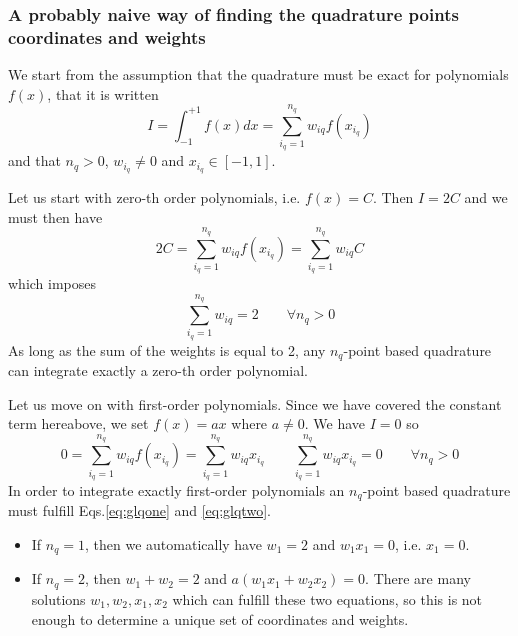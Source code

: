\subsubsection{A probably naive way of finding the quadrature points coordinates and weights}


We start from the assumption that the quadrature must be exact for polynomials $f(x)$, that it is 
written
\[
I= \int_{-1}^{+1} f(x) dx = \sum_{i_q=1}^{n_q} w_{iq} f(x_{i_q}) 
\]
and that $n_q>0$, $w_{i_q}\neq 0$ and $x_{i_q}\in [-1,1]$.

Let us start with zero-th order polynomials, i.e. $f(x)=C$. Then $I=2C$ and we must then 
have 
\[
2C = \sum_{i_q=1}^{n_q} w_{iq} f(x_{i_q})  =  \sum_{i_q=1}^{n_q} w_{iq} C   
\]
which imposes 
\begin{equation}
\boxed{
\sum_{i_q=1}^{n_q} w_{iq} = 2 \qquad \forall n_q>0
}
\label{eq:glqone}
\end{equation}
As long as the sum of the weights is equal to 2, any $n_q$-point based quadrature can 
integrate exactly a zero-th order polynomial. 

Let us move on with first-order polynomials. Since we have covered the constant term hereabove, we
set $f(x)=ax$ where $a\neq 0$. We have $I=0$ so
\begin{equation}
0 = \sum_{i_q=1}^{n_q} w_{iq} f(x_{i_q})  = \sum_{i_q=1}^{n_q} w_{iq} x_{i_q}
\qquad
\boxed{
\sum_{i_q=1}^{n_q} w_{iq} x_{i_q} = 0\qquad \forall n_q>0
}
 \label{eq:glqtwo}
\end{equation}
In order to integrate exactly first-order polynomials an $n_q$-point based quadrature must 
fulfill Eqs.\eqref{eq:glqone} and \eqref{eq:glqtwo}.
\begin{itemize}
\item
If $n_q=1$, then we automatically have $w_1=2$ and $w_1 x_1 =0 $, i.e. $x_1=0$.
\item
If $n_q=2$, then $w_1+w_2=2$ and $a(w_1x_1+w_2x_2) = 0$. There are many solutions $w_1,w_2,x_1,x_2$ which 
can fulfill these two equations, so this is not enough to determine a unique set of coordinates and weights.
\end{itemize}

